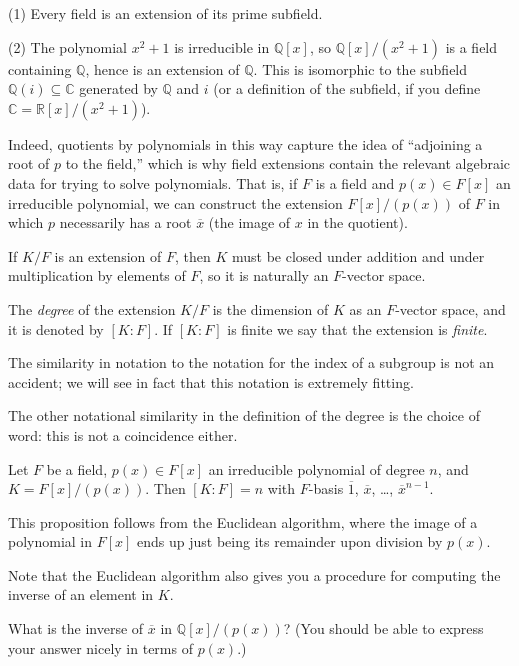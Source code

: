 \documentclass[10pt]{article}
\providecommand{\ol}{\overline}
\providecommand{\CC}{\mathbb C}
\providecommand{\QQ}{\mathbb Q}
\providecommand{\RR}{\mathbb R}
\providecommand{\vocab}[1]{{{\sffamily\textit{#1}}}}
\begin{document}
\begin{example}
    \label{ex:extensions}
    (1) Every field is an extension of its prime subfield.

    (2) The polynomial $x^2 + 1$ is irreducible in $\QQ[x]$,
    so $\QQ[x]/(x^2 + 1)$ is a field containing $\QQ$,
    hence is an extension of $\QQ$.
    This is isomorphic to the subfield $\QQ(i)\subseteq\CC$
    generated by $\QQ$ and $i$ (or a definition of the subfield,
    if you define $\CC = \RR[x]/(x^2 + 1)$).
\end{example}

Indeed, quotients by polynomials in this way
capture the idea of ``adjoining a root of $p$ to the field,''
which is why field extensions contain the relevant algebraic data
for trying to solve polynomials. That is,
if $F$ is a field and $p(x)\in F[x]$ an irreducible polynomial,
we can construct the extension $F[x]/(p(x))$ of $F$
in which $p$ necessarily has a root $\ol x$
(the image of $x$ in the quotient).

If $K/F$ is an extension of $F$, then $K$ must be closed under addition
and under multiplication by elements of $F$,
so it is naturally an $F$-vector space.
\begin{definition}
    \label{def:degree}
    The \vocab{degree} of the extension $K/F$
    is the dimension of $K$ as an $F$-vector space,
    and it is denoted by $[K:F]$.
    If $[K:F]$ is finite we say that the extension is \vocab{finite}.
\end{definition}
The similarity in notation to the notation for the index of a subgroup
is not an accident; we will see in fact that this notation
is extremely fitting.

The other notational similarity in the definition of the degree
is the choice of word: this is not a coincidence either.
\begin{prop}
    \label{prop:degree-of-extension-by-poly}
    Let $F$ be a field,
    $p(x)\in F[x]$ an irreducible polynomial of degree $n$,
    and $K = F[x]/(p(x))$. Then $[K:F] = n$
    with $F$-basis $\ol 1$, $\ol x$, \dots, $\ol x^{n-1}$.
\end{prop}

This proposition follows from the Euclidean algorithm,
where the image of a polynomial in $F[x]$ ends up just being
its remainder upon division by $p(x)$.


Note that the Euclidean algorithm also gives you a procedure
for computing the inverse of an element in $K$.
\begin{exercise}
    \label{exer:inverse-of-x}
    What is the inverse of $\ol x$ in $\QQ[x]/(p(x))$?
    (You should be able to express your answer nicely
    in terms of $p(x)$.)
\end{exercise}
\end{document}
